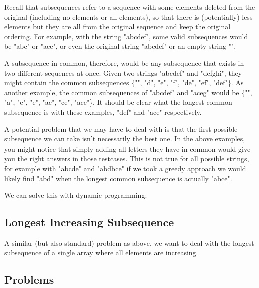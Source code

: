 Recall that subsequences refer to a sequence with some elements deleted from the original (including no elements or all elements), so that there is (potentially) less elements but they are all from the original sequence and keep the original ordering. For example, with the string "abcdef", some valid subsequences would be "abc" or "ace", or even the original string "abcdef" or an empty string "".

A subsequence in common, therefore, would be any subsequence that exists in two different sequences at once. Given two strings "abcdef" and "defghi", they might contain the common subsequences \{"", "d", "e", "f", "de", "ef", "def"\}. As another example, the common subsequences of "abcdef" and "aceg" would be \{"", "a", "c", "e", "ac", "ce", "ace"\}. It should be clear what the longest common subsequence is with these examples, "def" and "ace" respectively.

A potential problem that we may have to deal with is that the first possible subsequence we can take isn't necessarily the best one. In the above examples, you might notice that simply adding all letters they have in common would give you the right answers in those testcases. This is not true for all possible strings, for example with "abcde" and "abdbce" if we took a greedy approach we would likely find "abd" when the longest common subsequence is actually "abce".

We can solve this with dynamic programming:


\subsection{Longest Increasing Subsequence}

A similar (but also standard) problem as above, we want to deal with the longest subsequence of a single array where all elements are increasing.


\subsection{Problems}



\hrulefill



\hrulefill